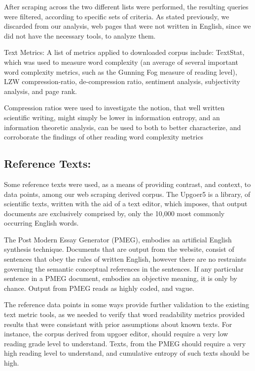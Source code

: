 \documentclass{clv3}
\begin{document}
After scraping across the two different lists were performed, the resulting queries were filtered, according to specific sets of criteria. As stated previously, we discarded from our analysis, web pages that were not written in English, since we did not have the necessary tools, to analyze them.

Text Metrics:
A list of metrics applied to downloaded corpus include: TextStat, which was used to measure word complexity (an average of several important word complexity metrics, such as the Gunning Fog measure of reading level), LZW compression-ratio, de-compression ratio, sentiment analysis, subjectivity analysis, and page rank.

Compression ratios were used to investigate the notion, that well written scientific writing, might simply be lower in information entropy, and an information theoretic analysis, can be used to both to better characterize, and corroborate the findings of other reading word complexity metrics

\subsection{Reference Texts:}

Some reference texts were used, as a means of providing contrast, and context, to data points, among our web scraping derived corpus. The Upgoer5 is a library, of scientific texts, written with the aid of a text editor, which imposes, that output documents are exclusively comprised by, only the 10,000 most commonly occurring English words.

The Post Modern Essay Generator (PMEG), embodies an artificial English synthesis technique. Documents that are output from the website, consist of sentences that obey the rules of written English, however there are no restraints governing the semantic conceptual references in the sentences. If any particular sentence in a PMEG document, embodies an objective meaning, it is only by chance. Output from PMEG reads as highly coded, and vague.

The reference data points in some ways provide further validation to the existing text metric tools, as we needed to verify that word readability metrics provided results that were consistant with prior assumptions about known texts. For instance, the corpus derived from upgoer editor, should require a very low reading grade level to understand. Texts, from the PMEG should require a very high reading level to understand, and cumulative entropy of such texts should be high.
\end{document}
